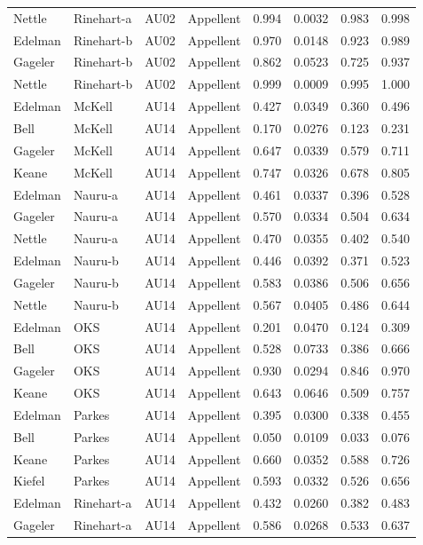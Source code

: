 \documentclass{monashthesis}
\begin{document}
\begin{center}
\begin{longtable}{llllllll}
Nettle & Rinehart-a & AU02 & Appellent & 0.994 & 0.0032 & 0.983 & 0.998 \\
Edelman & Rinehart-b & AU02 & Appellent & 0.970 & 0.0148 & 0.923 & 0.989 \\
Gageler & Rinehart-b & AU02 & Appellent & 0.862 & 0.0523 & 0.725 & 0.937 \\
Nettle & Rinehart-b & AU02 & Appellent & 0.999 & 0.0009 & 0.995 & 1.000 \\
Edelman & McKell & AU14 & Appellent & 0.427 & 0.0349 & 0.360 & 0.496 \\
Bell & McKell & AU14 & Appellent & 0.170 & 0.0276 & 0.123 & 0.231 \\
Gageler & McKell & AU14 & Appellent & 0.647 & 0.0339 & 0.579 & 0.711 \\
Keane & McKell & AU14 & Appellent & 0.747 & 0.0326 & 0.678 & 0.805 \\
Edelman & Nauru-a & AU14 & Appellent & 0.461 & 0.0337 & 0.396 & 0.528 \\
Gageler & Nauru-a & AU14 & Appellent & 0.570 & 0.0334 & 0.504 & 0.634 \\
Nettle & Nauru-a & AU14 & Appellent & 0.470 & 0.0355 & 0.402 & 0.540 \\
Edelman & Nauru-b & AU14 & Appellent & 0.446 & 0.0392 & 0.371 & 0.523 \\
Gageler & Nauru-b & AU14 & Appellent & 0.583 & 0.0386 & 0.506 & 0.656 \\
Nettle & Nauru-b & AU14 & Appellent & 0.567 & 0.0405 & 0.486 & 0.644 \\
Edelman & OKS & AU14 & Appellent & 0.201 & 0.0470 & 0.124 & 0.309 \\
Bell & OKS & AU14 & Appellent & 0.528 & 0.0733 & 0.386 & 0.666 \\
Gageler & OKS & AU14 & Appellent & 0.930 & 0.0294 & 0.846 & 0.970 \\
Keane & OKS & AU14 & Appellent & 0.643 & 0.0646 & 0.509 & 0.757 \\
Edelman & Parkes & AU14 & Appellent & 0.395 & 0.0300 & 0.338 & 0.455 \\
Bell & Parkes & AU14 & Appellent & 0.050 & 0.0109 & 0.033 & 0.076 \\
Keane & Parkes & AU14 & Appellent & 0.660 & 0.0352 & 0.588 & 0.726 \\
Kiefel & Parkes & AU14 & Appellent & 0.593 & 0.0332 & 0.526 & 0.656 \\
Edelman & Rinehart-a & AU14 & Appellent & 0.432 & 0.0260 & 0.382 & 0.483 \\
Gageler & Rinehart-a & AU14 & Appellent & 0.586 & 0.0268 & 0.533 & 0.637 \\

\end{longtable}
\end{center}
\end{document}
